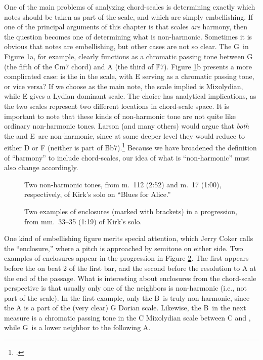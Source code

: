 One of the main problems of analyzing chord-scales is determining exactly
which notes should be taken as part of the scale, and which are simply
embellishing. If one of the principal arguments of this chapter is that scales
\emph{are} harmony, then the question becomes one of determining what is
non-harmonic. Sometimes it is obvious that notes are embellishing, but other
cases are not so clear. The G\sharp\ in Figure \ref{csa:non-harmonic-tones}a,
for example, clearly functions as a chromatic passing tone between G (the
fifth of the \h{Cm7} chord) and A (the third of \h{F7}). Figure
\ref{csa:non-harmonic-tones}b presents a more complicated case: is the \Eflat
in the scale, with E\nat{} serving as a chromatic passing tone, or vice versa?
If we choose \Eflat as the main note, the scale implied is \Bflat Mixolydian,
while E\nat{} gives a \Bflat Lydian dominant scale. The choice has analytical
implications, as the two scales represent two different locations in
chord-scale space. It is important to note that these kinds of non-harmonic
tone are not quite like ordinary non-harmonic tones. Larson (and many others)
would argue that \emph{both} the \Eflat and E\nat\ are non-harmonic, since at
some deeper level they would reduce to either D or F (neither is part of
\h{Bb7}).\footcite[5--10]{larson:2009} Because we have broadened the
definition of ``harmony'' to include chord-scales, our idea of what is
``non-harmonic'' must also change accordingly.

\begin{figure}[tbp]
  \caption[Two non-harmonic tones in Kirk's solo.]{Two non-harmonic tones, from
    m.~112 (2:52) and m.~17 (1:00), respectively, of Kirk's solo on ``Blues for Alice.''}
  \label{csa:non-harmonic-tones}
\end{figure}

\begin{figure}[tbp]
  \caption[Two examples of enclosures in a \tfo progression.]{Two examples of
    enclosures (marked with brackets) in a \tfo progression, from mm.~33--35
    (1:19) of Kirk's solo.}
  \label{csa:enclosures}
\end{figure}

One kind of embellishing figure merits special attention, which Jerry Coker
calls the ``enclosure,'' where a pitch is approached by semitone on either
side. Two examples of enclosures appear in the \tfo progression in
Figure \ref{csa:enclosures}. The first appears before the \Bflat on beat 2 of
the first bar, and the second before the resolution to A at the end of the
passage. What is interesting about enclosures from the chord-scale perspective
is that usually only one of the neighbors is non-harmonic (i.e., not part of
the scale). In the first example, only the B\nat\ is truly non-harmonic, since
the A is a part of the (very clear) G Dorian scale. Likewise, the B\nat\ in
the next measure is a chromatic passing tone in the C Mixolydian scale between
C and \Bflat, while G\sharp\ is a lower neighbor to the following A.

